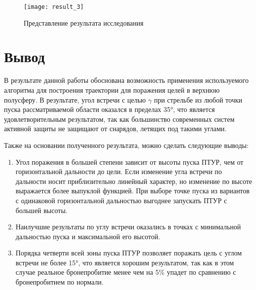 \begin{figure}[!h]
\begin{center}
	\texttt{[image: result\_3]}
	\caption{Представление результата исследования}
	\label{fig:result_3}
\end{center}
\end{figure}

\clearpage
\section{Вывод}
В результате данной работы обоснована возможность применения используемого алгоритма для построения траектории для поражения целей в верхнюю полусферу. В результате, угол встречи с целью $\gamma$ при стрельбе из любой точки пуска рассматриваемой области оказался в пределах 35°, что является удовлетворительным результатом, так как большинство современных систем активной защиты не защищают от снарядов, летящих под такими углами.

Также на основании полученного результата, можно сделать следующие выводы:
\begin{enumerate}[1.]
 	\item Угол поражения в большей степени зависит от высоты пуска ПТУР, чем от горизонтальной дальности до цели. Если изменение угла встречи по дальности носит приблизительно линейный характер, но изменение по высоте выражается более выпуклой функцией. При выборе точке пуска из вариантов с одинаковой горизонтальной дальностью выгоднее запускать ПТУР с большей высоты.
 	\item Наилучшие результаты по углу встречи оказались в точках с минимальной дальностью пуска и максимальной его высотой.
 	\item Порядка четверти всей зоны пуска ПТУР позволяет поражать цель с углом встречи не более 15°, что является хорошим результатом, так как в этом случае реальное бронепробитие менее чем на 5\% упадет по сравнению с бронепробитием по нормали.
\end{enumerate}
